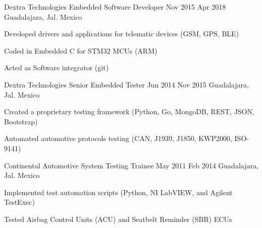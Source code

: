 \job
    {Dextra Technologies}
    {Embedded Software Developer}
    {Nov 2015}
    {Apr 2018}
    {Guadalajara, Jal. Mexico}
    {
        \begin{itemize-bullets}
            \item{Developed drivers and applications for telematic devices (GSM, GPS, BLE)}
            \item{Coded in Embedded C for STM32 MCUs (ARM)}
            \item{Acted as Software integrator (git)}
        \end{itemize-bullets}
    }

\job
    {Dextra Technologies}
    {Senior Embedded Tester}
    {Jun 2014}
    {Nov 2015}
    {Guadalajara, Jal. Mexico}
    {
        \begin{itemize-bullets}
            \item{Created a proprietary testing framework (Python, Go, MongoDB, REST, JSON, Bootstrap)}
            \item{Automated automotive protocols testing (CAN, J1939, J1850, KWP2000, ISO-9141)}
        \end{itemize-bullets}
    }

\job
    {Continental Automotive}
    {System Testing Trainee}
    {May 2011}
    {Feb 2014}
    {Guadalajara, Jal. Mexico}
    {
        \begin{itemize-bullets}
            \item{Implemented test automation scripts (Python, NI LabVIEW, and Agilent TestExec)}
            \item{Tested Airbag Control Units (ACU) and Seatbelt Reminder (SBR) ECUs}
        \end{itemize-bullets}
    }


